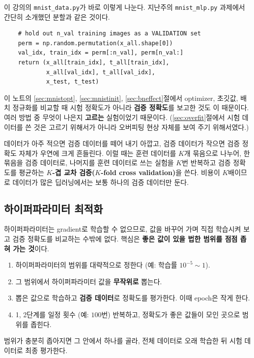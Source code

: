 \documentclass[11pt,a4paper]{article}
\begin{document}
이 강의의 \texttt{mnist\_data.py}가 바로 이렇게 나눈다.
지난주의 \texttt{mnist\_mlp.py} 과제에서 간단히 소개했던 분할과 같은 것이다.
\begin{lstlisting}
    # hold out n_val training images as a VALIDATION set
    perm = np.random.permutation(x_all.shape[0])
    val_idx, train_idx = perm[:n_val], perm[n_val:]
    return (x_all[train_idx], t_all[train_idx],
            x_all[val_idx], t_all[val_idx],
            x_test, t_test)
\end{lstlisting}
이 노트의 \ref{sec:mnistopt}, \ref{sec:mnistinit}, \ref{sec:bneffect}절에서 optimizer, 초깃값, 배치 정규화를 비교할 때
시험 정확도가 아니라 \textbf{검증 정확도}를 보고한 것도 이 때문이다.
여러 방법 중 무엇이 나은지 \textbf{고르는} 실험이었기 때문이다.
(\ref{sec:overfit}절에서 시험 데이터를 쓴 것은 고르기 위해서가 아니라 오버피팅 현상 자체를 보여 주기 위해서였다.)

\begin{remarkbox}[데이터가 적을 때: 교차 검증]
데이터가 아주 적으면 검증 데이터를 떼어 내기 아깝고, 검증 데이터가 작으면 검증 정확도 자체가 우연에 크게 흔들린다.
이럴 때는 훈련 데이터를 $K$개 묶음으로 나누어, 한 묶음을 검증 데이터로, 나머지를 훈련 데이터로 쓰는 실험을
$K$번 반복하고 검증 정확도를 평균하는 \textbf{$K$-겹 교차 검증($K$-fold cross validation)}을 쓴다.
비용이 $K$배이므로 데이터가 많은 딥러닝에서는 보통 하나의 검증 데이터만 둔다.
\end{remarkbox}

\subsection{하이퍼파라미터 최적화}\label{sec:hpo}

하이퍼파라미터는 gradient로 학습할 수 없으므로, 값을 바꾸어 가며 직접 학습시켜 보고 검증 정확도를 비교하는 수밖에 없다.
핵심은 \textbf{좋은 값이 있을 법한 범위를 점점 좁혀 가는 것}이다.

\begin{keybox}
\begin{enumerate}[label=\textbf{\arabic*단계}, leftmargin=4.2em, start=0]
\item 하이퍼파라미터의 범위를 대략적으로 정한다 (예: 학습률 $10^{-5}\sim1$).
\item 그 범위에서 하이퍼파라미터 값을 \textbf{무작위로} 뽑는다.
\item 뽑은 값으로 학습하고 \textbf{검증 데이터}로 정확도를 평가한다. 이때 epoch은 작게 한다.
\item 1, 2단계를 일정 횟수 (예: $100$번) 반복하고, 정확도가 좋은 값들이 모인 곳으로 범위를 좁힌다.
\end{enumerate}
범위가 충분히 좁아지면 그 안에서 하나를 골라, 전체 데이터로 오래 학습한 뒤 시험 데이터로 최종 평가한다.
\end{keybox}
\end{document}
